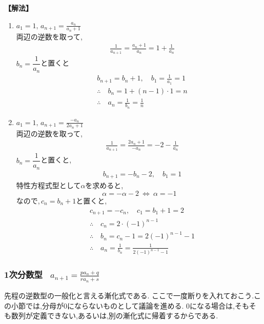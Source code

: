     \noindent\textbf{【解法】}
    \begin{enumerate}[label=(\arabic*),parsep=3pt]
      \item $\displaystyle a_1=1,\, a_{n+1}=\frac{a_n}{a_n+1}$\\
            両辺の逆数を取って,
            \begin{align*}
              &\frac{1}{a_{n+1}}=\frac{a_n+1}{a_n}=1+\frac{1}{a_n}
            \end{align*}
            $b_n=\dfrac{1}{a_n}$と置くと
            \begin{align*}
              &b_{n+1}=b_n+1,\quad b_1=\frac{1}{a_1}=1\\
              &\therefore \quad b_n=1+(n-1)\cdot1=n\\
              &\therefore \quad a_n=\frac{1}{b_n}=\frac{1}{n}
            \end{align*}
      \item $\displaystyle a_1=1,\, a_{n+1}=\frac{-a_n}{2a_n+1}$\\
            両辺の逆数を取って,
            \begin{align*}
              &\frac{1}{a_{n+1}}=\frac{2a_n+1}{-a_n}=-2-\frac{1}{a_n}
            \end{align*}
            $b_n=\dfrac{1}{a_n}$と置くと,
            \begin{align*}
              &b_{n+1}=-b_n-2,\quad b_1=1
            \end{align*}
            特性方程式型として$\alpha$を求めると,
            \[
              \alpha=-\alpha-2 \ \Leftrightarrow\ \alpha=-1
            \]
            なので,\,$c_n=b_n+1$と置くと,
            \begin{align*}
              &c_{n+1}=-c_n,\quad c_1=b_1+1=2\\
              &\therefore \quad c_n=2\cdot(-1)^{n-1}\\
              &\therefore \quad b_n=c_n-1=2(-1)^{n-1}-1\\
              &\therefore \quad a_n=\frac{1}{b_n}=\frac{1}{2(-1)^{n-1}-1}
            \end{align*}
    \end{enumerate}
  \subsubsection{1次分数型 \, $\displaystyle a_{n+1}=\frac{pa_n+q}{ra_n+s}$}
    先程の逆数型の一般化と言える漸化式である.
    ここで一度断りを入れておこう.この小節では,分母が0にならないものとして議論を進める.
    0になる場合は,そもそも数列が定義できない,あるいは,別の漸化式に帰着するからである.

